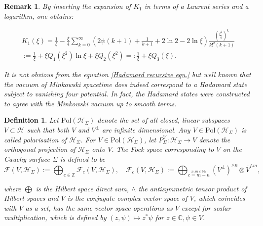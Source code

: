 \documentclass[a4paper,11pt]{article}
\newtheorem{de}{Definition}
\newtheorem{rmk}{Remark}
\begin{document}
\begin{rmk}
By inserting the expansion of \(K_1\) in terms of a Laurent series and a logarithm, \cite{abramowitz1965handbook} one obtains:

\begin{align}\label{K1series}
K_1(\xi) = \frac{1}{\xi}- \frac{\xi}{4} \sum_{k=0}^\infty \left(2 \psi(k+1)+\frac{1}{k+1}+2\ln 2 -2 \ln \xi \right) \frac{\left(\frac{\xi^2}{4}\right)^k}{k!^2 (k+1)}\\\label{def:Q}
:=\frac{1}{\xi} + \xi Q_1(\xi^2) \ln \xi +\xi Q_2(\xi^2)=:\frac{1}{\xi} + \xi Q_3(\xi).
\end{align}

It is not obvious from the equation \eqref{Hadamard recursive equ.} but well known that the
 vacuum of Minkowski spacetime does indeed
correspond to  a Hadamard state subject to vanishing four potential. In fact, the Hadamard states were constructed to 
agree with the Minkowski vacuum up to smooth terms.
\end{rmk}




\begin{de}
Let \(\text{Pol} (\mathcal{H}_\Sigma)\) denote the set of all closed, linear subspaces \(V\subset \mathcal{H}\)
such that both \(V\) and \(V^\perp\) are infinite dimensional. Any \(V\in \text{Pol}(\mathcal{H}_\Sigma)\) is called 
\emph{polarisation} of \(\mathcal{H}_\Sigma\). For \(V\in \text{Pol}(\mathcal{H}_\Sigma)\), let \(P_\Sigma^V:\mathcal{H}_{\Sigma}\rightarrow V\) 
denote the orthogonal projection of \(\mathcal{H}_\Sigma\) onto \(V\).
The Fock space corresponding to \(V\) on the Cauchy surface \(\Sigma\) is defined to be
\begin{equation}
\mathcal{F}(V,\mathcal{H}_\Sigma) := \bigoplus_{c\in\mathbb{Z}} \mathcal{F}_c (V,\mathcal{H}_\Sigma), \quad 
\mathcal{F}_c(V,\mathcal{H}_\Sigma):= \bigoplus_{\overset{n,m\in\mathbb{N}_0}{c=m-n}}(V^\perp)^{\wedge n} \otimes \overline{V}^{\wedge m},
\end{equation}

where \(\bigoplus\) is the Hilbert space direct sum, \(\wedge\) the antisymmetric tensor product of Hilbert spaces and 
\(\overline{V}\) is the conjugate complex vector space of \(V\), which coincides with \(V\) as a set, has the same vector 
space operations as \(V\) except for scalar multiplication, which is defined by \((z,\psi)\mapsto z^* \psi\) for 
\(z\in\mathbb{C},\psi\in V\).
\end{de}
\end{document}
